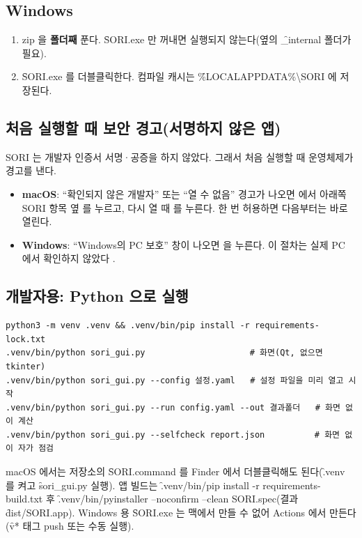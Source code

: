 \documentclass[10.5pt,a4paper]{article}
\begin{document}
\subsection{Windows}
\begin{enumerate}
\item zip 을 \textbf{폴더째} 푼다. \f{SORI.exe} 만 꺼내면 실행되지 않는다(옆의 \f{\_internal} 폴더가 필요).
\item \f{SORI.exe} 를 더블클릭한다. 컴파일 캐시는 \f{\%LOCALAPPDATA\%\textbackslash SORI} 에 저장된다.
\end{enumerate}

\subsection{처음 실행할 때 보안 경고(서명하지 않은 앱)}
SORI 는 개발자 인증서 서명·공증을 하지 않았다. 그래서 처음 실행할 때 운영체제가 경고를 낸다.
\begin{itemize}
\item \textbf{macOS}: ``확인되지 않은 개발자'' 또는 ``열 수 없음'' 경고가 나오면 \menu{}에서 아래쪽 SORI 항목 옆 를 누르고, 다시 열 때 를 누른다. 한 번 허용하면 다음부터는 바로 열린다.
\item \textbf{Windows}: ``Windows의 PC 보호'' 창이 나오면 \menu{}을 누른다. 이 절차는 실제 PC 에서 확인하지 않았다 \chk.
\end{itemize}

\subsection{개발자용: Python 으로 실행}
\begin{Verbatim}
python3 -m venv .venv && .venv/bin/pip install -r requirements-lock.txt
.venv/bin/python sori_gui.py                     # 화면(Qt, 없으면 tkinter)
.venv/bin/python sori_gui.py --config 설정.yaml   # 설정 파일을 미리 열고 시작
.venv/bin/python sori_gui.py --run config.yaml --out 결과폴더   # 화면 없이 계산
.venv/bin/python sori_gui.py --selfcheck report.json          # 화면 없이 자가 점검
\end{Verbatim}
macOS 에서는 저장소의 \f{SORI.command} 를 Finder 에서 더블클릭해도 된다(\f{.venv} 를 켜고 \f{sori\_gui.py} 실행). 앱 빌드는 \f{.venv/bin/pip install -r requirements-build.txt} 후 \f{.venv/bin/pyinstaller --noconfirm --clean SORI.spec}(결과 \f{dist/SORI.app}). Windows 용 \f{SORI.exe} 는 맥에서 만들 수 없어 Actions 에서 만든다(\f{v*} 태그 push 또는 수동 실행).
\end{document}
